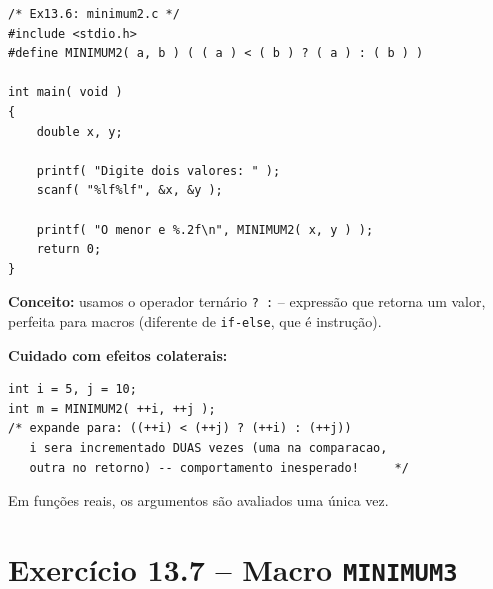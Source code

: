 \documentclass[12pt,a4paper]{article}
\begin{document}
\begin{respostabox}
\begin{lstlisting}
/* Ex13.6: minimum2.c */
#include <stdio.h>
#define MINIMUM2( a, b ) ( ( a ) < ( b ) ? ( a ) : ( b ) )

int main( void )
{
    double x, y;

    printf( "Digite dois valores: " );
    scanf( "%lf%lf", &x, &y );

    printf( "O menor e %.2f\n", MINIMUM2( x, y ) );
    return 0;
}
\end{lstlisting}

\textbf{Conceito:} usamos o operador ternário \texttt{? :} -- expressão que
retorna um valor, perfeita para macros (diferente de \texttt{if-else}, que é
instrução).

\begin{erroco}
  \textbf{Cuidado com efeitos colaterais:}
\begin{lstlisting}
int i = 5, j = 10;
int m = MINIMUM2( ++i, ++j );
/* expande para: ((++i) < (++j) ? (++i) : (++j))
   i sera incrementado DUAS vezes (uma na comparacao,
   outra no retorno) -- comportamento inesperado!     */
\end{lstlisting}
Em funções reais, os argumentos são avaliados uma única vez.
\end{erroco}
\end{respostabox}

\newpage

\section{Exercício 13.7 -- Macro \texttt{MINIMUM3}}
\end{document}

